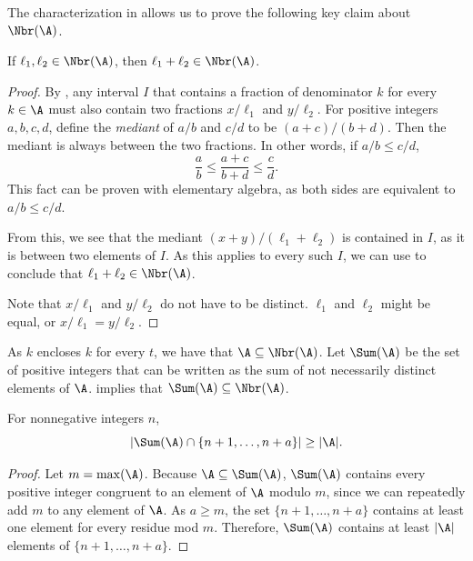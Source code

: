 \documentclass{toc}
\begin{document}
The characterization in  allows us to prove the following key claim about $\Nbr(\A)$.

\begin{claim}
    \label{claim:sumcondition}
    If $\ell_1,\ell_2\in \Nbr(\A)$, then $\ell_1+\ell_2\in \Nbr(\A)$.
\end{claim}

\begin{proof}
    By , any interval $I$ that contains a fraction of denominator $k$ for every $k\in \A$ must also contain two fractions $x/\ell_1$ and $y/\ell_2$. For positive integers $a,b,c,d$, define the \emph{mediant} of $a/b$ and $c/d$ to be $(a+c)/(b+d)$. Then the mediant is always between the two fractions. In other words, if $a/b\le c/d$,
    \[\frac{a}{b}\le \frac{a+c}{b+d}\le \frac{c}{d}. \]
    This fact can be proven with elementary algebra, as both sides are equivalent to $a/b\le c/d$.
    
    From this, we see that the mediant $(x+y)/(\ell_1+\ell_2)$ is contained in $I$, as it is between two elements of $I$. As this applies to every such $I$, we can use  to conclude that $\ell_1+\ell_2\in \Nbr(\A)$.
    
    Note that $x/\ell_1$ and $y/\ell_2$ do not have to be distinct. $\ell_1$ and $\ell_2$ might be equal, or $x/\ell_1=y/\ell_2$.
\end{proof}

As $k$ encloses $k$ for every $t$, we have that $\A\subseteq \Nbr(\A)$. Let $\Sum(\A)$ be the set of positive integers that can be written as the sum of not necessarily distinct elements of $\A$.  implies that $\Sum(\A)\subseteq \Nbr(\A)$.

\begin{claim}
    For nonnegative integers $n$, \[\lvert\Sum(\A)\cap \{n+1,\dots,n+a\}\rvert\ge |\A|.\]
\end{claim}

\begin{proof}
    Let $m=\max(\A)$. Because $\A\subseteq \Sum(\A)$, $\Sum(\A)$ contains every positive integer congruent to an element of $\A$ modulo $m$, since we can repeatedly add $m$ to any element of $\A$. As $a\ge m$, the set $\{n+1,\dots,n+a\}$ contains at least one element for every residue mod $m$. Therefore, $\Sum(\A)$ contains at least $|\A|$ elements of $\{n+1,\dots,n+a\}$. 
\end{proof}
\end{document}
